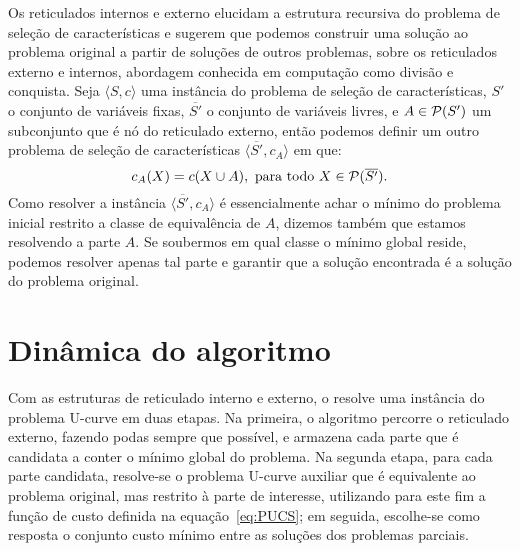
Os reticulados internos e externo elucidam a estrutura recursiva do 
problema de seleção de características e sugerem que podemos construir 
uma solução ao problema original a partir de soluções de outros 
problemas, sobre os reticulados externo e internos, abordagem conhecida
em computação como divisão e conquista. Seja $\langle S, c \rangle$ uma 
instância do problema de seleção de características, $S'$ o conjunto de 
variáveis fixas, $\overline{S'}$ o conjunto de variáveis livres, e 
$A \in \mathcal{P} (S')$ um subconjunto que é nó do reticulado externo, 
então podemos definir um outro problema de seleção de características 
$\langle \overline{S'}, c_{A} \rangle$ em que: 
\begin{equation} \label{eq:PUCS}
    c_{A} (X) = c (X \cup A), \mbox{ para todo } X \in \mathcal{P} (\overline{S'}).
\end{equation}
Como resolver a instância $\langle \overline{S'}, c_{A} \rangle$ é 
essencialmente achar o mínimo do problema inicial restrito a classe de
equivalência de $A$, dizemos também que estamos resolvendo a parte $A$. 
Se soubermos em qual classe o mínimo global reside, podemos resolver 
apenas tal parte e garantir que a solução encontrada é a solução do 
problema original.

%
%

\section{Dinâmica do algoritmo}
Com as estruturas de reticulado interno e externo, o  
resolve uma instância do problema U-curve em duas etapas. Na primeira, o
algoritmo percorre o reticulado externo, fazendo podas sempre que 
possível, e armazena cada parte que é candidata a conter o mínimo global
do problema. Na segunda etapa, para cada parte candidata, resolve-se o
problema U-curve auxiliar que é equivalente ao problema original, mas 
restrito à parte de interesse, utilizando para este fim a função de custo definida na equação~\ref{eq:PUCS}; em seguida, escolhe-se como resposta o conjunto custo mínimo entre as soluções dos problemas parciais.



